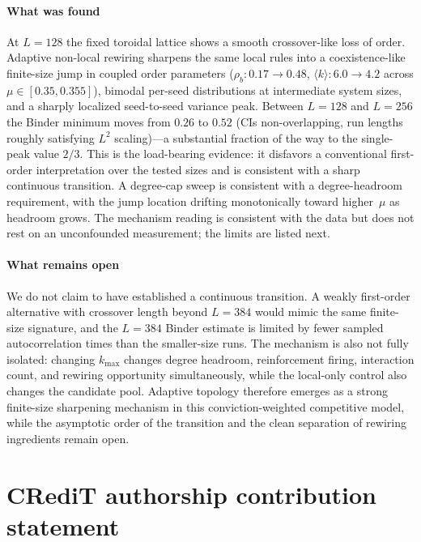 \documentclass[preprint,12pt]{elsarticle}
\newcommand{\rb}{\rho_b}              %
\newcommand{\kavg}{\langle k \rangle} %
\newcommand{\Lsys}{L}                 %
\newcommand{\kmax}{k_{\max}}           %
\begin{document}
\paragraph{What was found}
At $\Lsys = 128$ the fixed toroidal lattice shows a smooth
crossover-like loss of order.
Adaptive non-local rewiring sharpens the same local rules
into a coexistence-like finite-size jump in coupled order
parameters ($\rb: 0.17 \to 0.48$, $\kavg: 6.0 \to 4.2$ across
$\mu \in [0.35, 0.355]$), bimodal per-seed distributions at
intermediate system sizes, and a sharply localized
seed-to-seed variance peak.
Between $\Lsys = 128$ and $\Lsys = 256$ the Binder minimum
moves from $0.26$ to $0.52$ (CIs non-overlapping, run lengths
roughly satisfying $\Lsys^2$ scaling)---a substantial fraction
of the way to the single-peak value $2/3$.
This is the load-bearing evidence: it disfavors a conventional
first-order interpretation over the tested sizes and is
consistent with a sharp continuous transition.
A degree-cap sweep is consistent with a degree-headroom
requirement, with the jump location drifting monotonically
toward higher~$\mu$ as headroom grows.
The mechanism reading is consistent with the data but does not
rest on an unconfounded measurement; the limits are listed next.

\paragraph{What remains open}
We do not claim to have established a continuous transition.
A weakly first-order alternative with crossover length beyond
$\Lsys = 384$ would mimic the same finite-size signature, and
the $\Lsys = 384$ Binder estimate is limited by fewer sampled
autocorrelation times than the smaller-size runs.
The mechanism is also not fully isolated: changing $\kmax$
changes degree headroom, reinforcement firing, interaction
count, and rewiring opportunity simultaneously, while the
local-only control also changes the candidate pool.
Adaptive topology therefore emerges as a strong finite-size
sharpening mechanism in this conviction-weighted competitive
model, while the asymptotic order of the transition and the
clean separation of rewiring ingredients remain open.

\section*{CRediT authorship contribution statement}
\end{document}
